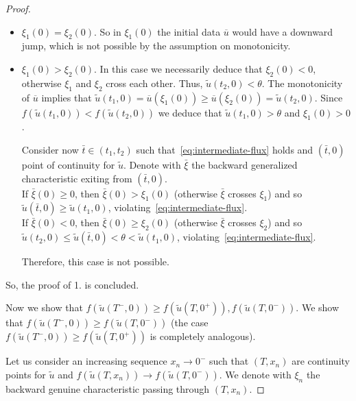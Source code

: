 \documentclass[10pt,a4paper]{amsart}
\begin{document}
\begin{proof}
\begin{itemize}
      Therefore, this case is not possible.
    
    \item[(ii)] $\xi_1(0) = \xi_2(0)$. So in  $\xi_1(0)$ the initial data $\overline u$ would have a downward jump, 
    which is not possible by the assumption on monotonicity. 

    \item[(iii)] $\xi_1(0) > \xi_2(0)$. In this case we necessarily deduce that $\xi_2(0) < 0$, otherwise
      $\xi_1$ and $\xi_2$ cross each other. Thus, $\widetilde{u}(t_2, 0) < \theta$.
      The monotonicity of $\overline u$ implies that
      $\widetilde{u}(t_1, 0) = \overline u(\xi_1(0)) \ge \overline u(\xi_2(0)) = \widetilde{u}(t_2, 0)$.
      Since $f(\widetilde{u}(t_1, 0)) < f(\widetilde{u}(t_2, 0))$ we deduce that
      $\widetilde{u}(t_1, 0) > \theta$ and $\xi_1(0) > 0$.

      Consider now $\bar t \in (t_1, t_2)$ such that~\eqref{eq:intermediate-flux} holds 
      and $(\bar t, 0)$ point of continuity for $\widetilde{u}$.
      Denote with $\bar \xi$ the backward generalized characteristic exiting from $(\bar t, 0)$.\\
      If $\bar \xi(0) \ge 0$, then $\bar \xi(0) > \xi_1(0)$ (otherwise $\bar \xi$ crosses $\xi_1$)
      and so $\widetilde{u}(\bar t, 0) \ge \widetilde{u}(t_1, 0)$, 
      violating~\eqref{eq:intermediate-flux}.\\
      If $\bar \xi(0) < 0$, then $\bar \xi(0) \ge \xi_2(0)$ (otherwise $\bar \xi$ crosses $\xi_2$)
      and so $\widetilde{u}(t_2, 0) \le \widetilde{u}(\bar t, 0) < \theta <  \widetilde{u}(t_1, 0)$, 
      violating~\eqref{eq:intermediate-flux}.

      Therefore, this case is not possible. 
  \end{itemize}
So, the proof of 1. is concluded.
\smallskip

Now we show that $f(\widetilde{u}(T^-, 0))\geq f(\widetilde{u}(T, 0^+)), f(\widetilde{u}(T, 0^-))$. We show that 
$f(\widetilde{u}(T^-, 0))\geq  f(\widetilde{u}(T, 0^-))$ (the case $f(\widetilde{u}(T^-, 0))\geq f(\widetilde{u}(T, 0^+))$ 
is completely analogous). 

Let us consider an increasing  sequence $x_n\to 0^-$   such that $(T,x_n)$  are continuity points for $\widetilde u$ 
and $f(\widetilde{u}(T, x_n))\to f(\widetilde{u}(T, 0^-))$. We denote with $\xi_n$ the backward genuine characteristic 
passing through $(T,x_n)$. 


\end{proof}
\end{document}
